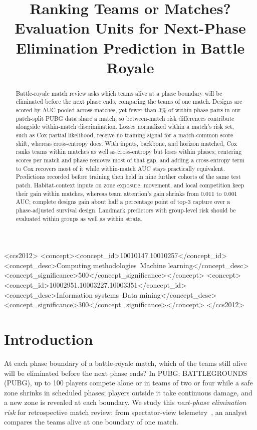 \documentclass[sigconf,anonymous,nonacm]{acmart}
\begin{document}
\title[Evaluation Units for Next-Phase Elimination Prediction]{Ranking Teams or Matches? Evaluation Units for Next-Phase Elimination Prediction in Battle Royale}
\begin{abstract}
Battle-royale match review asks which teams alive at a phase boundary will be eliminated before the next phase ends, comparing the teams of one match. Designs are scored by AUC pooled across matches, yet fewer than 3\% of within-phase pairs in our patch-split PUBG data share a match, so between-match risk differences contribute alongside within-match discrimination. Losses normalized within a match's risk set, such as Cox partial likelihood, receive no training signal for a match-common score shift, whereas cross-entropy does. With inputs, backbone, and horizon matched, Cox ranks teams within matches as well as cross-entropy but loses within phases; centering scores per match and phase removes most of that gap, and adding a cross-entropy term to Cox recovers most of it while within-match AUC stays practically equivalent. Predictions recorded before training then held in nine further cohorts of the same test patch. Habitat-context inputs on zone exposure, movement, and local competition keep their gain within matches, whereas team attention's gain shrinks from 0.011 to 0.001 AUC; complete designs gain about half a percentage point of top-3 capture over a phase-adjusted survival design. Landmark predictors with group-level risk should be evaluated within groups as well as within strata.
\end{abstract}
\begin{CCSXML}
<ccs2012>
<concept><concept_id>10010147.10010257</concept_id><concept_desc>Computing methodologies~Machine learning</concept_desc><concept_significance>500</concept_significance></concept>
<concept><concept_id>10002951.10003227.10003351</concept_id><concept_desc>Information systems~Data mining</concept_desc><concept_significance>300</concept_significance></concept>
</ccs2012>
\end{CCSXML}
\maketitle
\section{Introduction}
\label{sec:introduction}
At each phase boundary of a battle-royale match, which of the teams still alive will be eliminated before the next phase ends? In PUBG: BATTLEGROUNDS (PUBG), up to 100 players compete alone or in teams of two or four while a safe zone shrinks in scheduled phases; players outside it take continuous damage, and a new zone is revealed at each boundary. We study this \emph{next-phase elimination risk} for retrospective match review: from spectator-view telemetry~\cite{PUBGAPI,Zheng15}, an analyst compares the teams alive at one boundary of one match.
\end{document}
